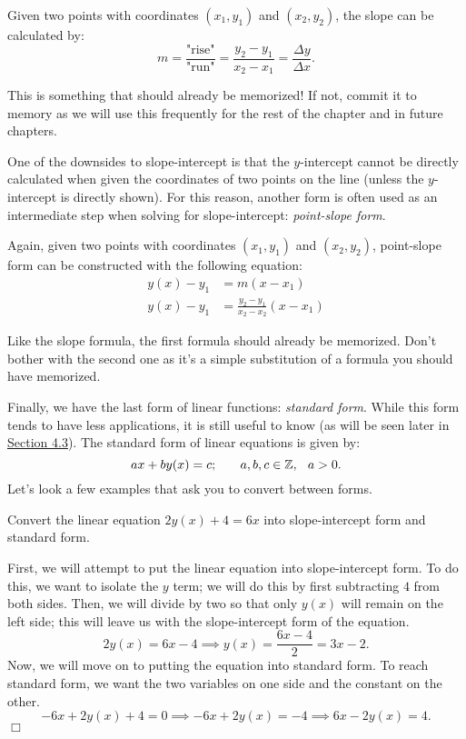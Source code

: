 \documentclass[lang=en,11pt]{elegantbook}
\begin{document}
Given two points with coordinates $(x_1,y_1)$ and $(x_2,y_2)$, the slope can be calculated by: $$m=\dfrac{\text{"rise"}}{\text{"run"}}=\dfrac{y_2-y_1}{x_2-x_1}=\dfrac{\Delta y}{\Delta x}.$$
\begin{note}
This is something that should already be memorized!  If not, commit it to memory as we will use this frequently for the rest of the chapter and in future chapters.
\end{note}
One of the downsides to slope-intercept is that the $y$-intercept cannot be directly calculated when given the coordinates of two points on the line (unless the $y$-intercept is directly shown).  For this reason, another form is often used as an intermediate step when solving for slope-intercept: \textit{point-slope form}.  

Again, given two points with coordinates $(x_1,y_1)$ and $(x_2,y_2)$, point-slope form can be constructed with the following equation: \begin{align*}
    y(x)-y_1&=m\left(x-x_1\right) \\ 
    y(x)-y_1&=\frac{y_2-y_1}{x_2-x_2}\left(x-x_1\right)
\end{align*}
\begin{note}
Like the slope formula, the first formula should already be memorized.  Don't bother with the second one as it's a simple substitution of a formula you should have memorized.
\end{note}
Finally, we have the last form of linear functions: \textit{standard form}.  While this form tends to have less applications, it is still useful to know (as will be seen later in \hyperlink{section.4.3}{Section 4.3}).  The standard form of linear equations is given by: $$ax+by(x)=c; \hspace{0.25in} a,b,c\in\mathbb{Z}, \hspace{0.10in} a>0.$$
Let's look a few examples that ask you to convert between forms.
\begin{example}
Convert the linear equation $2y(x)+4=6x$ into slope-intercept form and standard form.
\end{example}
\begin{solution}
First, we will attempt to put the linear equation into slope-intercept form.  To do this, we want to isolate the $y$ term; we will do this by first subtracting $4$ from both sides.  Then, we will divide by two so that only $y(x)$ will remain on the left side; this will leave us with the slope-intercept form of the equation.  $$2y(x)=6x-4 \implies y(x)=\dfrac{6x-4}{2}=3x-2.$$
Now, we will move on to putting the equation into standard form.  To reach standard form, we want the two variables on one side and the constant on the other.
$$-6x+2y(x)+4=0 \implies -6x+2y(x)=-4 \implies 6x-2y(x)=4.$$ $\Box$
\end{solution}
\end{document}
